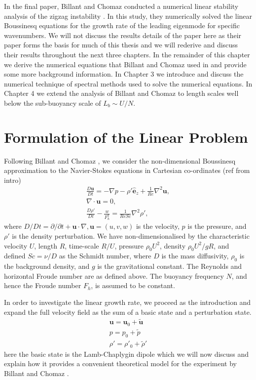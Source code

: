 In the final paper, Billant and Chomaz conducted a numerical linear stability analysis of the zigzag instability \cite{bc2000c}. In this study, they numerically solved the linear Boussinesq equations for the growth rate of the leading eigenmode for specific wavenumbers. We will not discuss the results details of the paper here as their paper forms the basis for much of this thesis and we will rederive and discuss their results throughout the next three chapters. In the remainder of this chapter we derive the numerical equations that Billant and Chomaz used in \cite{bc2000c} and provide some more background information. In Chapter 3 we introduce and discuss the numerical technique of spectral methods used to solve the numerical equations. In Chapter 4 we extend the analysis of Billant and Chomaz to length scales well below the sub-buoyancy scale of $L_{b}\sim U/N$. 

\section{Formulation of the Linear Problem}
Following Billant and Chomaz \cite{bc2000c}, we consider the non-dimensional Boussinesq approximation to the Navier-Stokes equations in Cartesian co-ordinates (ref from intro)
\begin{align}
\frac{D\bm{u}}{Dt} = -\nabla p - \rho'\hat{\bm{e}}_{z} + \frac{1}{Re}\nabla^{2} \bm{u},\\
\nabla \cdot \bm{u}=0,\\
\frac{D\rho'}{Dt} -\frac{w}{F_{h}^{2}} = \frac{1}{ReSc}\nabla^{2} \rho',
\end{align}
where $D/Dt=\partial/\partial t + \bm{u}\cdot \nabla, \bm{u}=(u,v,w)$ is the velocity, $p$ is the pressure, and $\rho'$ is the density perturbation. We have non-dimensionalised by the characteristic velocity $U$, length $R$, time-scale $R/U$, pressure $\rho_{0}U^{2}$, density $\rho_{0}U^{2}/gR$, and defined $Sc=\nu /D$ as the Schmidt number, where $D$ is the mass diffusivity, $\rho_{0}$ is the background density, and $g$ is the gravitational constant. The Reynolds and horizontal Froude number are as defined above. The buoyancy frequency $N$, and hence the Froude number $F_{h}$, is assumed to be constant. 

In order to investigate the linear growth rate, we proceed as the introduction and expand the full velocity field as the sum of a basic state and a perturbation state. 
\begin{align}
\bm{u} = \bm{u}_{0} + \tilde{\bm{u}}\\
p = p_{0} + \tilde{p}\\
\rho' = \rho'_{0} + \tilde{\rho}' 
\end{align}
here the basic state is the Lamb-Chaplygin dipole which we will now discuss and explain how it provides a convenient theoretical model for the experiment by Billant and Chomaz \cite{bc2000a}.


